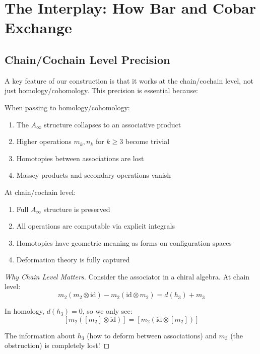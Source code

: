 
\section{The Interplay: How Bar and Cobar Exchange}

\subsection{Chain/Cochain Level Precision}

A key feature of our construction is that it works at the chain/cochain level, not just homology/cohomology. This precision is essential because:

\begin{theorem}
When passing to homology/cohomology:
\begin{enumerate}
\item The $A_\infty$ structure collapses to an associative product
\item Higher operations $m_k, n_k$ for $k \geq 3$ become trivial
\item Homotopies between associations are lost
\item Massey products and secondary operations vanish
\end{enumerate}

At chain/cochain level:
\begin{enumerate}
\item Full $A_\infty$ structure is preserved
\item All operations are computable via explicit integrals
\item Homotopies have geometric meaning as forms on configuration spaces
\item Deformation theory is fully captured
\end{enumerate}
\end{theorem}

\begin{proof}[Why Chain Level Matters]
Consider the associator in a chiral algebra. At chain level:
$$m_2(m_2 \otimes \text{id}) - m_2(\text{id} \otimes m_2) = d(h_3) + m_3$$

In homology, $d(h_3) = 0$, so we only see:
$$[m_2([m_2] \otimes \text{id})] = [m_2(\text{id} \otimes [m_2])]$$

The information about $h_3$ (how to deform between associations) and $m_3$ (the obstruction) is completely lost!
\end{proof}

